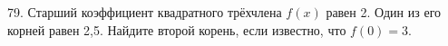 79. Старший коэффициент квадратного трёхчлена $f(x)$ равен 2. Один из его корней равен 2,5. Найдите второй корень, если известно, что $f(0)=3.$\\
